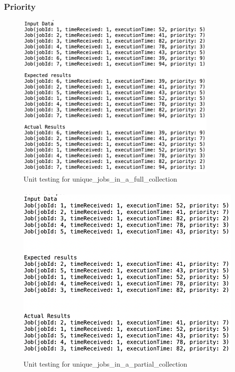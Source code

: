 \documentclass[a4paper]{article}
\begin{document}
\subsubsection{Priority}
\begin{figure}[H]
   \includegraphics[height=8.2cm]{images/Priority-unique_jobs_in_a_full_collection.png}
   \caption{Unit testing for unique\_jobs\_in\_a\_full\_collection}
\end{figure}

\begin{figure}[H]
   \includegraphics[height=9cm]{images/Priority-unique_jobs_in_a_partial_collection.png}
   \caption{Unit testing for unique\_jobs\_in\_a\_partial\_collection}
\end{figure}
\end{document}
